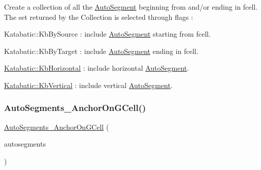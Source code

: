 Create a collection of all the \hyperlink{classKatabatic_1_1AutoSegment}{Auto\+Segment} beginning from and/or ending in {\ttfamily fcell}. The set returned by the Collection is selected through {\ttfamily flags} \+:
\begin{DoxyItemize}
\item Katabatic\+::\+Kb\+By\+Source \+: include \hyperlink{classKatabatic_1_1AutoSegment}{Auto\+Segment} starting from {\ttfamily fcell}.
\item Katabatic\+::\+Kb\+By\+Target \+: include \hyperlink{classKatabatic_1_1AutoSegment}{Auto\+Segment} ending in {\ttfamily fcell}.
\item \hyperlink{namespaceKatabatic_a2af2ad6b6441614038caf59d04b3b217a1a9045673c5d3c30b067100f1440ae1b}{Katabatic\+::\+Kb\+Horizontal} \+: include horizontal \hyperlink{classKatabatic_1_1AutoSegment}{Auto\+Segment}.
\item \hyperlink{namespaceKatabatic_a2af2ad6b6441614038caf59d04b3b217a284cad95203a27172838b09e396e3590}{Katabatic\+::\+Kb\+Vertical} \+: include vertical \hyperlink{classKatabatic_1_1AutoSegment}{Auto\+Segment}. 
\end{DoxyItemize}\mbox{\label{classKatabatic_1_1AutoSegments__AnchorOnGCell_a4597cd793ef7f6a5be546b24863f99e8}} 
\subsubsection{\texorpdfstring{Auto\+Segments\+\_\+\+Anchor\+On\+G\+Cell()}{AutoSegments\_AnchorOnGCell()}\hspace{0.1cm}{\footnotesize\ttfamily [2/2]}}
{\footnotesize\ttfamily \hyperlink{classKatabatic_1_1AutoSegments__AnchorOnGCell}{Auto\+Segments\+\_\+\+Anchor\+On\+G\+Cell} (\begin{DoxyParamCaption}\item[{const \hyperlink{classKatabatic_1_1AutoSegments__AnchorOnGCell}{Auto\+Segments\+\_\+\+Anchor\+On\+G\+Cell} \&}]{autosegments }\end{DoxyParamCaption})\hspace{0.3cm}{\ttfamily [inline]}}

